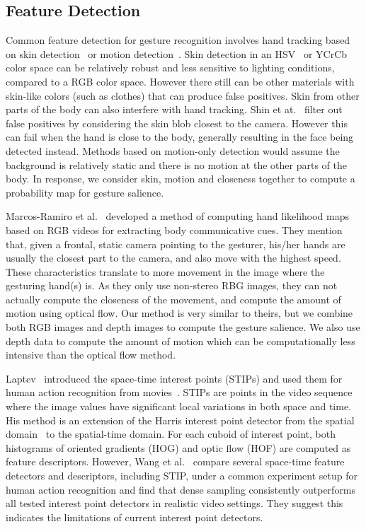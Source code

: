 \documentclass{sigchi}
\begin{document}
\subsection{Feature Detection}
Common feature detection for gesture recognition involves hand tracking based on skin detection~\cite{shin2004} or motion detection~\cite{cutler1998}.
Skin detection in an HSV~\cite{Bradski98} or YCrCb color space can be relatively robust and less sensitive to lighting conditions,
compared to a RGB color space. However there still can be other materials 
with skin-like colors (such as clothes) that can produce false positives. Skin from other parts of the body can also interfere with hand tracking. 
Shin et at.~\cite{shin2004} filter out false positives by considering the skin blob closest to the camera. However this can fail when the hand is close to
the body, generally resulting in the face being detected instead. Methods based on motion-only detection would assume the background is relatively static and there is no motion at
the other parts of the body. In response, we consider skin, motion and closeness together to compute a probability map for gesture salience. 

Marcos-Ramiro et al.~\cite{marcos2013} developed a method of computing hand likelihood maps based on RGB videos
for extracting body communicative cues. They mention that, given a frontal, static camera pointing to the gesturer,  his/her hands are usually the closest
part to the camera, and also move with the highest speed. These characteristics translate to more movement in the image where
the gesturing hand(s) is. As they only use non-stereo RBG images, they can not actually compute the closeness of the movement, and compute the amount
 of motion using optical flow.
Our method is very similar to theirs, but we combine both RGB images and depth images to compute
the gesture salience. We also use depth data to compute the amount of motion which can be computationally less intensive than the optical flow method.

Laptev~\cite{laptev2003} introduced the space-time interest points (STIPs) and used them for human
action recognition from movies~\cite{laptev2008}. STIPs are points in the video sequence where the image values have
significant local variations in both space and time. His method is an extension of the Harris interest point detector from the spatial domain~\cite{Harris88}
to the spatial-time domain. For each cuboid of interest point, both histograms of oriented gradients (HOG)
and optic flow (HOF) are computed as feature descriptors. However, Wang et al.~\cite{wang-spatio-2009} compare several space-time feature detectors and
descriptors, including STIP, under a common experiment setup for human action recognition and find that dense sampling consistently
outperforms all tested interest point detectors in realistic video settings. They suggest this indicates the limitations of 
current interest point detectors.
\end{document}
